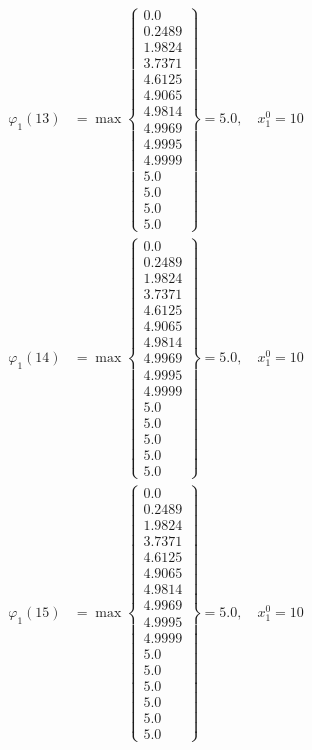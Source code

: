 \documentclass{article}
\begin{document}
\begin{align*}
  
\varphi_{1}(13) &= \max \left\{ \begin{array}{c}
0.0 \\
 0.2489 \\
 1.9824 \\
 3.7371 \\
 4.6125 \\
 4.9065 \\
 4.9814 \\
 4.9969 \\
 4.9995 \\
 4.9999 \\
 5.0 \\
 5.0 \\
 5.0 \\
 5.0
\end{array} \right\}=5.0,\quad x_{1}^0=10\\
  
  
  
  
\varphi_{1}(14) &= \max \left\{ \begin{array}{c}
0.0 \\
 0.2489 \\
 1.9824 \\
 3.7371 \\
 4.6125 \\
 4.9065 \\
 4.9814 \\
 4.9969 \\
 4.9995 \\
 4.9999 \\
 5.0 \\
 5.0 \\
 5.0 \\
 5.0 \\
 5.0
\end{array} \right\}=5.0,\quad x_{1}^0=10\\
  
  
  
  
\varphi_{1}(15) &= \max \left\{ \begin{array}{c}
0.0 \\
 0.2489 \\
 1.9824 \\
 3.7371 \\
 4.6125 \\
 4.9065 \\
 4.9814 \\
 4.9969 \\
 4.9995 \\
 4.9999 \\
 5.0 \\
 5.0 \\
 5.0 \\
 5.0 \\
 5.0 \\
 5.0
\end{array} \right\}=5.0,\quad x_{1}^0=10\\
  

\end{align*}
\end{document}
